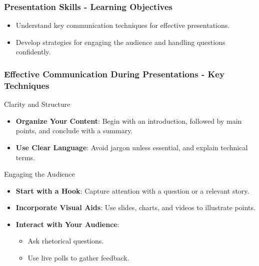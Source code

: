 \documentclass[aspectratio=169]{beamer}
\begin{document}
\begin{frame}[fragile]
    \frametitle{Presentation Skills - Learning Objectives}
    \begin{itemize}
        \item Understand key communication techniques for effective presentations.
        \item Develop strategies for engaging the audience and handling questions confidently.
    \end{itemize}
\end{frame}

\begin{frame}[fragile]
    \frametitle{Effective Communication During Presentations - Key Techniques}
    \begin{block}{Clarity and Structure}
        \begin{itemize}
            \item \textbf{Organize Your Content}: Begin with an introduction, followed by main points, and conclude with a summary.
            \item \textbf{Use Clear Language}: Avoid jargon unless essential, and explain technical terms.
        \end{itemize}
    \end{block}

    \begin{block}{Engaging the Audience}
        \begin{itemize}
            \item \textbf{Start with a Hook}: Capture attention with a question or a relevant story.
            \item \textbf{Incorporate Visual Aids}: Use slides, charts, and videos to illustrate points.
            \item \textbf{Interact with Your Audience}: 
                \begin{itemize}
                    \item Ask rhetorical questions.
                    \item Use live polls to gather feedback.
                \end{itemize}
        \end{itemize}
    \end{block}
\end{frame}
\end{document}
